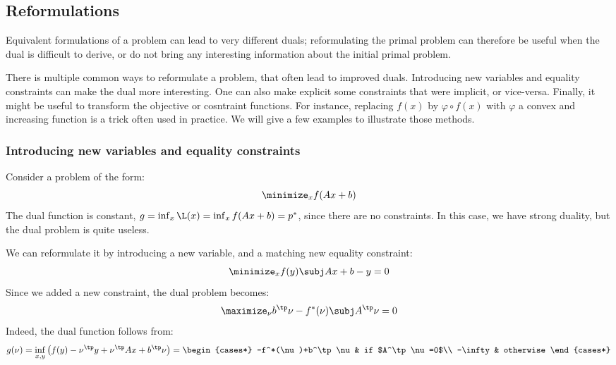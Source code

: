 \subsection{Reformulations}
Equivalent formulations of a problem can lead to very different duals; reformulating the primal problem can therefore be useful when the dual is difficult to derive, or do not bring any interesting information about the initial primal problem.

There is multiple common ways to reformulate a problem, that often lead to improved duals. Introducing new variables and equality constraints can make the dual more interesting. One can also make explicit some constraints that were implicit, or vice-versa. Finally, it might be useful to transform the objective or cosntraint functions. For instance, replacing $f(x)$ by $\varphi\circ f(x)$ with $\varphi$ a convex and increasing function is a trick often used in practice. We will give a few examples to illustrate those methods.

\subsubsection{Introducing new variables and equality constraints}
Consider a problem of the form:
\begin{equation*}
    \minimize_x f(Ax+b)
\end{equation*}
The dual function is constant, $g=\inf_x \L(x) = \inf_x f(Ax+b)=p^*$, since there are no constraints. In this case, we have strong duality, but the dual problem is quite useless.

We can reformulate it by introducing a new variable, and a matching new equality constraint:
\begin{equation*}
    \minimize_x f(y) \subj Ax+b-y=0
\end{equation*}
Since we added a new constraint, the dual problem becomes:
\begin{equation*}
    \maximize_\nu b^\tp\nu - f^*(\nu) \subj A^\tp\nu=0
\end{equation*}
Indeed, the dual function follows from:
\begin{equation*}
    g(\nu) = \inf_{x,y}\left(f(y)-\nu^\tp y +\nu^\tp Ax+b^\tp\nu\right) = \begin{cases*}
        -f^*(\nu)+b^\tp\nu & if $A^\tp\nu=0$\\
        -\infty & otherwise
    \end{cases*}
\end{equation*}

